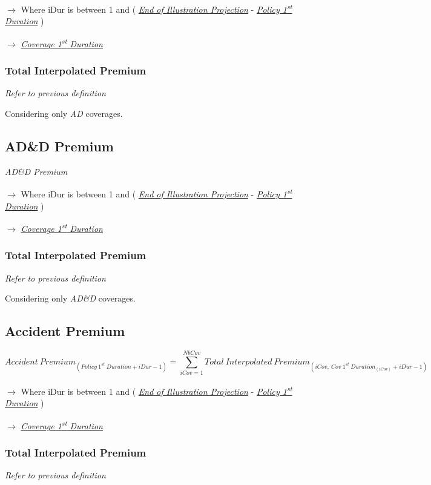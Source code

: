 \documentclass[10pt]{article}
\begin{document}
$\rightarrow$ Where iDur is between 1 and ( \underline{\textit{End of Illustration Projection}} - \underline{\textit{Policy 1\textsuperscript{st} Duration}} )

$\rightarrow$ \underline{\textit{Coverage 1\textsuperscript{st} Duration}}

\subsubsection{Total Interpolated Premium}
\textit{Refer to previous definition}

Considering only \textit{AD} coverages.

\subsection{AD\&D Premium}
\textit{AD\&D Premium}

$\rightarrow$ Where iDur is between 1 and ( \underline{\textit{End of Illustration Projection}} - \underline{\textit{Policy 1\textsuperscript{st} Duration}} )

$\rightarrow$ \underline{\textit{Coverage 1\textsuperscript{st} Duration}}

\subsubsection{Total Interpolated Premium}
\textit{Refer to previous definition}

Considering only \textit{AD\&D} coverages.

\subsection{Accident Premium}
\[
{Accident\ Premium}_{\left(Policy\ 1^{st}\ Duration+iDur-1\right)} = \sum_{iCov=1}^{NbCov} {Total\ Interpolated\ Premium}_{\left(iCov,\ {Cov\ 1^{st}\ Duration}_{\left(iCov\right)}+iDur-1\right)}
\]

$\rightarrow$ Where iDur is between 1 and ( \underline{\textit{End of Illustration Projection}} - \underline{\textit{Policy 1\textsuperscript{st} Duration}} )

$\rightarrow$ \underline{\textit{Coverage 1\textsuperscript{st} Duration}}

\subsubsection{Total Interpolated Premium}
\textit{Refer to previous definition}
\end{document}
